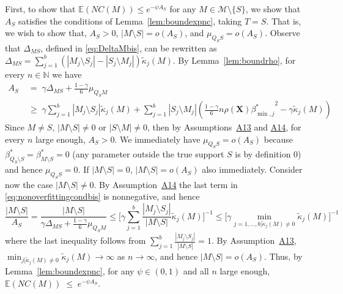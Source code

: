 \documentclass[bj,authoryear]{imsart}
\theoremstyle{plain}
\newcommand{\E}{\mathbb{E}}
\newcommand{\N}{\mathbb{N}}
\newcommand{\bs}{\boldsymbol}
\begin{document}
First, to show that $\E(NC(M)) \leq e^{-\psi A_S}$
for any $M\in\mathcal{M}\setminus \{S\}$, we show that $A_S$ satisfies the conditions of Lemma~\ref{lem:boundexpnc}, taking $T=S$. 
That is, we wish to show that, $A_S>0$, $|M\setminus S|=o(A_S)$, and $\mu_{Q_S S}=o(A_S)$. 
Observe that $\Delta_{MS}$, defined in \eqref{eq:DeltaMbis}, can be rewritten as $\Delta_{MS}=\sum_{j=1}^b(|M_j\setminus S_j|-|S_j\setminus M_j|)\tilde{\kappa}_j(M)$. By  Lemma~\ref{lem:boundrho}, for every $n\in \N$ we have 
\begin{equation}\label{eq:nonoverfittingcondbis}
\begin{aligned}
   A_S\;&=\; \gamma \Delta_{MS}+\frac{1-\gamma}{6}\mu_{Q_SM}\\
   &\geq\; \gamma\sum_{j=1}^b|M_j \setminus S_j|\tilde{\kappa}_j(M) + \sum_{j=1}^b |S_j\setminus M_j |\left(\tfrac{1-\gamma}{6} n \rho(\bs X) {\beta^*_{\min,j}}^{2} - \gamma\tilde{\kappa}_j(M)\right) 
\end{aligned}
\end{equation} 
Since $M\neq S$, $|M\setminus S|\neq0$ or $|S\setminus M|\neq0$, then by Assumptions~\hyperlink{lab:A13}{A13} and \hyperlink{lab:A4}{A14}, for every $n$ large enough, $A_S>0$. We immediately have $\mu_{Q_S S}=o(A_S)$ because $\beta^*_{Q_S\setminus S}=\beta^*_{M\setminus S}=0$ (any parameter outside the true support $S$ is by definition 0) and hence $\mu_{Q_S S}=0$.
If $|M\setminus S|=0$, $|M\setminus S|=o(A_S)$ also immediately. Consider now the case $|M\setminus S|\neq 0$. By Assumption~\hyperlink{lab:A4}{A14} the last term in \eqref{eq:nonoverfittingcondbis} is nonnegative, and hence
$$\frac{|M\setminus S|}{A_S}
= \frac{|M\setminus S|}{\gamma \Delta_{MS}+\frac{1-\gamma}{6}\mu_{Q_SM}}
\leq \bigg[ \gamma\sum_{j=1}^b\frac{|M_j \setminus S_j|}{|M\setminus S|}\tilde{\kappa}_j(M) \bigg]^{-1} \leq \Big[ \gamma\min_{j=1,\ldots,b|\tilde{\kappa}_j(M) \neq0}\tilde{\kappa}_j(M) \Big]^{-1} $$
where the last inequality follows from $\sum_{j=1}^b\frac{|M_j \setminus S_j|}{|M\setminus S|}=1$. By Assumption~\hyperlink{lab:A13}{A13}, $\min_{j|\tilde{\kappa}_j(M) \neq0} \tilde{\kappa}_j(M) \to \infty$ as $n \rightarrow \infty$, and hence $|M\setminus S|=o(A_S)$. Thus, %
by Lemma~\ref{lem:boundexpnc}, for any $\psi\in(0,1)$ and all $n$ large enough,
$
\E(NC(M))\;\leq\;e^{-\psi A_S}.
$
\end{document}
